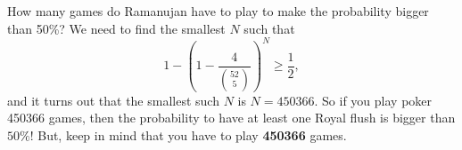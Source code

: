 \documentclass{article}
\begin{document}
How many games do Ramanujan have to play to make the probability bigger than 50\%? We need to find the smallest $N$ such that 
$$
1 - \left(1 - \frac{4}{\binom{52}{5}}\right)^{N} \geq \frac{1}{2},
$$
and it turns out that the smallest such $N$ is $N = 450366$. So if you play poker 450366 games, then the probability to have at least one Royal flush is bigger than $50\%$! But, keep in mind that you have to play \textbf{450366} games. 
\end{document}
